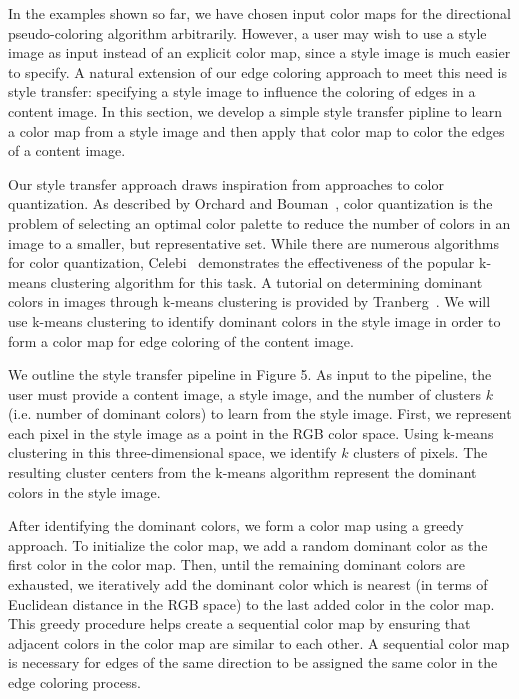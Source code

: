 \documentclass{article}
\begin{document}
In the examples shown so far, we have chosen input color maps for the directional pseudo-coloring algorithm arbitrarily. However, a user may wish to use a style image as input instead of an explicit color map, since a style image is much easier to specify. A natural extension of our edge coloring approach to meet this need is style transfer: specifying a style image to influence the coloring of edges in a content image. In this section, we develop a simple style transfer pipline to learn a color map from a style image and then apply that color map to color the edges of a content image.

Our style transfer approach draws inspiration from approaches to color quantization. As described by Orchard and Bouman~\cite{Orchard1991ColorQO}, color quantization is the problem of selecting an optimal color palette to reduce the number of colors in an image to a smaller, but representative set. While there are numerous algorithms for color quantization, Celebi~\cite{Celebi} demonstrates the effectiveness of the popular k-means clustering algorithm for this task. A tutorial on determining dominant colors in images through k-means clustering is provided by Tranberg~\cite{Tranberg}. We will use k-means clustering to identify dominant colors in the style image in order to form a color map for edge coloring of the content image.

We outline the style transfer pipeline in Figure 5. As input to the pipeline, the user must provide a content image, a style image, and the number of clusters $k$ (i.e. number of dominant colors) to learn from the style image. First, we represent each pixel in the style image as a point in the RGB color space. Using k-means clustering in this three-dimensional space, we identify $k$ clusters of pixels. The resulting cluster centers from the k-means algorithm represent the dominant colors in the style image.

After identifying the dominant colors, we form a color map using a greedy approach. To initialize the color map, we add a random dominant color as the first color in the color map. Then, until the remaining dominant colors are exhausted, we iteratively add the dominant color which is nearest (in terms of Euclidean distance in the RGB space) to the last added color in the color map. This greedy procedure helps create a sequential color map by ensuring that adjacent colors in the color map are similar to each other. A sequential color map is necessary for edges of the same direction to be assigned the same color in the edge coloring process.
\end{document}
